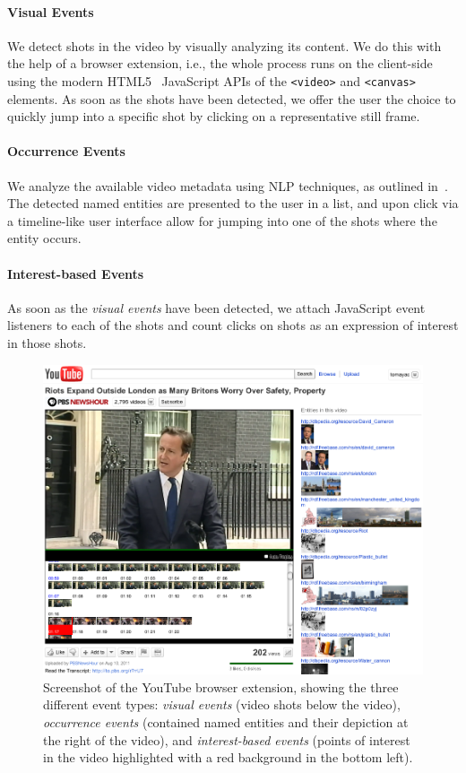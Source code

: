 \documentclass[runningheads,a4paper]{llncs}
\begin{document}
\paragraph{Visual Events}
We detect shots in the video by visually analyzing its content. We do this with the help of a browser extension, i.e., the whole process runs on the client-side using the modern HTML5~\cite{w3c_html5} JavaScript APIs of the \texttt{<video>} and \texttt{<canvas>} elements. As soon as the shots have been detected, we offer the user the choice to quickly jump into a specific shot by clicking on a representative still frame. 

\paragraph{Occurrence Events}
We analyze the available video metadata using NLP techniques, as outlined in~\cite{semwebvid}. The detected named entities are presented to the user in a list, and upon click via a timeline-like user interface allow for jumping into one of the shots where the entity occurs.

\paragraph{Interest-based Events} As soon as the \emph{visual events} have been detected, we attach JavaScript event listeners to each of the shots and count clicks on shots as an expression of interest in those shots.

\begin{figure}[h]
\begin{center}
   \includegraphics[width=0.8\linewidth]{./resources/youtube}
\end{center}
   \caption{Screenshot of the YouTube browser extension, showing the three different event types: \emph{visual events} (video shots below the video), \emph{occurrence events} (contained named entities and their depiction at the right of the video), and \emph{interest-based events} (points of interest in the video highlighted with a red background in the bottom left).}
\label{fig:youtube}
\end{figure}
\end{document}
